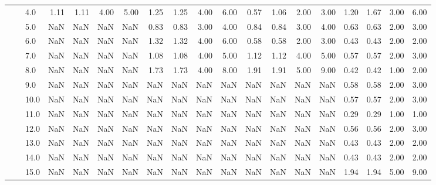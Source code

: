 \begin{tabular}{lllrrrrrrrrrrrrrrrr}
     &     & 4.0  &       1.11 &      1.11 &  4.00 &   5.00 &       1.25 &      1.25 & 4.00 &   6.00 &       0.57 &      1.06 & 2.00 &   3.00 &       1.20 &      1.67 & 3.00 &   6.00 \\
     &     & 5.0  &        NaN &       NaN &   NaN &    NaN &       0.83 &      0.83 & 3.00 &   4.00 &       0.84 &      0.84 & 3.00 &   4.00 &       0.63 &      0.63 & 2.00 &   3.00 \\
     &     & 6.0  &        NaN &       NaN &   NaN &    NaN &       1.32 &      1.32 & 4.00 &   6.00 &       0.58 &      0.58 & 2.00 &   3.00 &       0.43 &      0.43 & 2.00 &   2.00 \\
     &     & 7.0  &        NaN &       NaN &   NaN &    NaN &       1.08 &      1.08 & 4.00 &   5.00 &       1.12 &      1.12 & 4.00 &   5.00 &       0.57 &      0.57 & 2.00 &   3.00 \\
     &     & 8.0  &        NaN &       NaN &   NaN &    NaN &       1.73 &      1.73 & 4.00 &   8.00 &       1.91 &      1.91 & 5.00 &   9.00 &       0.42 &      0.42 & 1.00 &   2.00 \\
     &     & 9.0  &        NaN &       NaN &   NaN &    NaN &        NaN &       NaN &  NaN &    NaN &        NaN &       NaN &  NaN &    NaN &       0.58 &      0.58 & 2.00 &   3.00 \\
     &     & 10.0 &        NaN &       NaN &   NaN &    NaN &        NaN &       NaN &  NaN &    NaN &        NaN &       NaN &  NaN &    NaN &       0.57 &      0.57 & 2.00 &   3.00 \\
     &     & 11.0 &        NaN &       NaN &   NaN &    NaN &        NaN &       NaN &  NaN &    NaN &        NaN &       NaN &  NaN &    NaN &       0.29 &      0.29 & 1.00 &   1.00 \\
     &     & 12.0 &        NaN &       NaN &   NaN &    NaN &        NaN &       NaN &  NaN &    NaN &        NaN &       NaN &  NaN &    NaN &       0.56 &      0.56 & 2.00 &   3.00 \\
     &     & 13.0 &        NaN &       NaN &   NaN &    NaN &        NaN &       NaN &  NaN &    NaN &        NaN &       NaN &  NaN &    NaN &       0.43 &      0.43 & 2.00 &   2.00 \\
     &     & 14.0 &        NaN &       NaN &   NaN &    NaN &        NaN &       NaN &  NaN &    NaN &        NaN &       NaN &  NaN &    NaN &       0.43 &      0.43 & 2.00 &   2.00 \\
     &     & 15.0 &        NaN &       NaN &   NaN &    NaN &        NaN &       NaN &  NaN &    NaN &        NaN &       NaN &  NaN &    NaN &       1.94 &      1.94 & 5.00 &   9.00 \\

\end{tabular}
